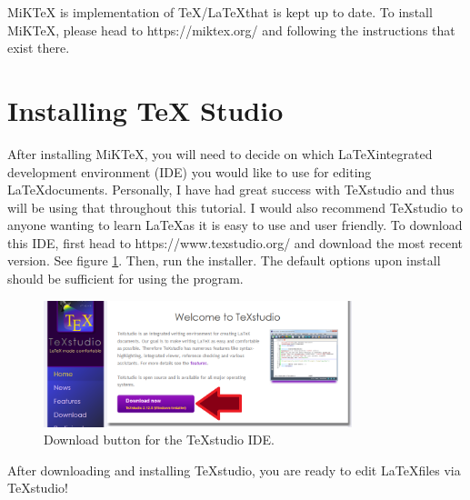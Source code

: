 MiKTeX is implementation of TeX/\LaTeX that is kept up to date. To install MiKTeX, please head to https://miktex.org/ and following the instructions that exist there.

\section{Installing TeX Studio}

After installing MiKTeX, you will need to decide on which \LaTeX integrated development environment (IDE) you would like to use for editing \LaTeX documents. Personally, I have had great success with TeXstudio and thus will be using that throughout this tutorial. I would also recommend TeXstudio to anyone wanting to learn \LaTeX as it is easy to use and user friendly. To download this IDE, first head to https://www.texstudio.org/ and download the most recent version. See figure \ref{TeXstudio}. Then, run the installer. The default options upon install should be sufficient for using the program.

\begin{figure}[h]
	\centering
	\includegraphics[width=0.8\textwidth]{images/texstudio.png}
	\caption{Download button for the TeXstudio IDE.} \label{TeXstudio}
\end{figure}


After downloading and installing TeXstudio, you are ready to edit \LaTeX files via TeXstudio! 


